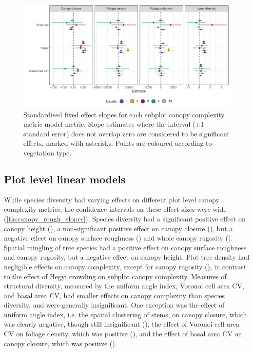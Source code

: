 \begin{refsection}
\begin{figure}
	\includegraphics[width=\linewidth]{img/height_profile_mod_rich_slopes_sites}
	\caption[Subplot canopy complexity metric fixed effects]{Standardised fixed effect slopes for each subplot canopy complexity metric model metric. Slope estimates where the interval ($\pm$1 standard error) does not overlap zero are considered to be significant effects, marked with asterisks. Points are coloured according to vegetation type.}
	\label{tls:height_profile_mod_rich_slopes_sites}
\end{figure}



\subsection{Plot level linear models}
\label{tls:ssec:plot_models}

While species diversity had varying effects on different plot level canopy complexity metrics, the confidence intervals on these effect sizes were wide (\autoref{tls:canopy_rough_slopes}). Species diversity had a significant positive effect on canopy height (\shannonHeightP{}), a non-significant positive effect on canopy closure (\shannonCoverP{}), but a negative effect on canopy surface roughness (\shannonRoughP{}) and whole canopy rugosity (\shannonRugP{}). Spatial mingling of tree species had a positive effect on canopy surface roughness and canopy rugosity, but a negative effect on canopy height. Plot tree density had negligible effects on canopy complexity, except for canopy rugosity (\treeDensRugP{}), in contrast to the effect of Hegyi crowding on subplot canopy complexity. Measures of structural diversity, measured by the uniform angle index, Voronoi cell area CV, and basal area CV, had smaller effects on canopy complexity than species diversity, and were generally insignificant. One exception was the effect of uniform angle index, i.e. the spatial clustering of stems, on canopy closure, which was clearly negative, though still insignificant (\wiCoverP{}), the effect of Voronoi cell area CV on foliage density, which was positive (\voronoiDensP{}), and the effect of basal area CV on canopy closure, which was positive (\baCoverP{}). 


\end{refsection}
